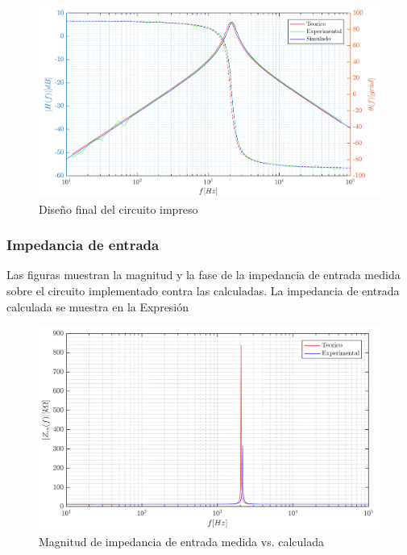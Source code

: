 \begin{figure}[ht]
\centering
\includegraphics[scale=0.4]{resources/bode_todos}
\caption{Diseño final del circuito impreso}
\label{1_bode}
\end{figure}

\subsubsection{Impedancia de entrada}
Las figuras muestran la magnitud y la fase de la impedancia de entrada medida sobre el circuito implementado contra las calculadas. La impedancia de entrada calculada se muestra en la Expresión

\begin{figure}[H]
\centering
\includegraphics[scale=0.4]{resources/impedancia_entrada_mag}
\caption{Magnitud de impedancia de entrada medida vs. calculada}
\label{1_zin_mag}
\end{figure}

